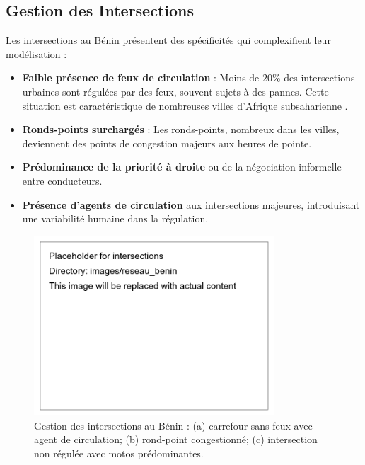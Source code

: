 \subsection{Gestion des Intersections}
\label{subsec:gestion_intersections}

Les intersections au Bénin présentent des spécificités qui complexifient leur modélisation :

\begin{itemize}
\item \textbf{Faible présence de feux de circulation} : Moins de 20\% des intersections urbaines sont régulées par des feux, souvent sujets à des pannes. Cette situation est caractéristique de nombreuses villes d'Afrique subsaharienne \cite{loggoh2019traffic}.

\item \textbf{Ronds-points surchargés} : Les ronds-points, nombreux dans les villes, deviennent des points de congestion majeurs aux heures de pointe.

\item \textbf{Prédominance de la priorité à droite} ou de la négociation informelle entre conducteurs.

\item \textbf{Présence d'agents de circulation} aux intersections majeures, introduisant une variabilité humaine dans la régulation.
\end{itemize}

\begin{figure}[htbp]
\centering
\includegraphics[width=0.8\textwidth]{images/reseau_benin/intersections}
\caption{Gestion des intersections au Bénin : (a) carrefour sans feux avec agent de circulation; (b) rond-point congestionné; (c) intersection non régulée avec motos prédominantes.}
\label{fig:intersections}
\end{figure}

